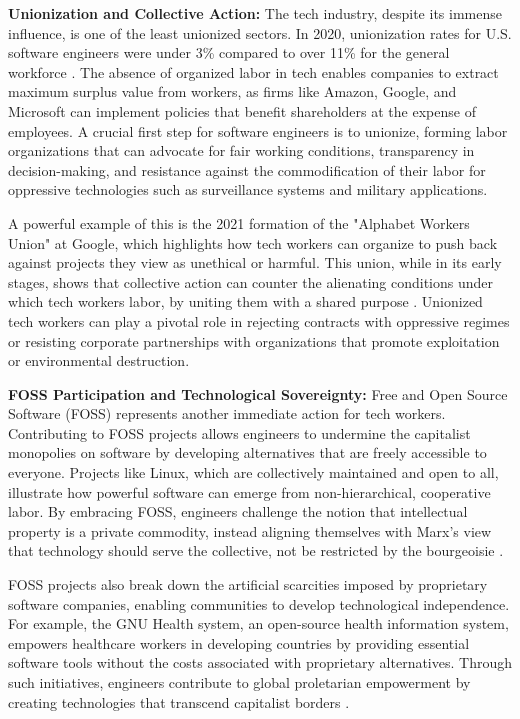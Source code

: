 \begin{refsection}
\textbf{Unionization and Collective Action:}
The tech industry, despite its immense influence, is one of the least unionized sectors. In 2020, unionization rates for U.S. software engineers were under 3\% compared to over 11\% for the general workforce \cite[pp.~56-58]{birch2020}. The absence of organized labor in tech enables companies to extract maximum surplus value from workers, as firms like Amazon, Google, and Microsoft can implement policies that benefit shareholders at the expense of employees. A crucial first step for software engineers is to unionize, forming labor organizations that can advocate for fair working conditions, transparency in decision-making, and resistance against the commodification of their labor for oppressive technologies such as surveillance systems and military applications.

A powerful example of this is the 2021 formation of the "Alphabet Workers Union" at Google, which highlights how tech workers can organize to push back against projects they view as unethical or harmful. This union, while in its early stages, shows that collective action can counter the alienating conditions under which tech workers labor, by uniting them with a shared purpose \cite[pp.~120-123]{zuboff2020}. Unionized tech workers can play a pivotal role in rejecting contracts with oppressive regimes or resisting corporate partnerships with organizations that promote exploitation or environmental destruction.

\textbf{FOSS Participation and Technological Sovereignty:}
Free and Open Source Software (FOSS) represents another immediate action for tech workers. Contributing to FOSS projects allows engineers to undermine the capitalist monopolies on software by developing alternatives that are freely accessible to everyone. Projects like Linux, which are collectively maintained and open to all, illustrate how powerful software can emerge from non-hierarchical, cooperative labor. By embracing FOSS, engineers challenge the notion that intellectual property is a private commodity, instead aligning themselves with Marx’s view that technology should serve the collective, not be restricted by the bourgeoisie \cite[pp.~714-716]{marx1867}.

FOSS projects also break down the artificial scarcities imposed by proprietary software companies, enabling communities to develop technological independence. For example, the GNU Health system, an open-source health information system, empowers healthcare workers in developing countries by providing essential software tools without the costs associated with proprietary alternatives. Through such initiatives, engineers contribute to global proletarian empowerment by creating technologies that transcend capitalist borders \cite[pp.~57-60]{stallman2010}.


\end{refsection}
